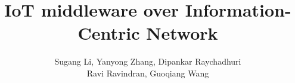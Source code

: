 \documentclass{sig-alternate-10pt}
\begin{document}
\title{IoT middleware over Information-Centric Network}
\author{
\alignauthor 
Sugang Li, Yanyong Zhang, Dipankar Raychadhuri\\
Ravi Ravindran, Guoqiang Wang\\
\\
\\
}
\maketitle





\balance
\scriptsize


\end{document}
